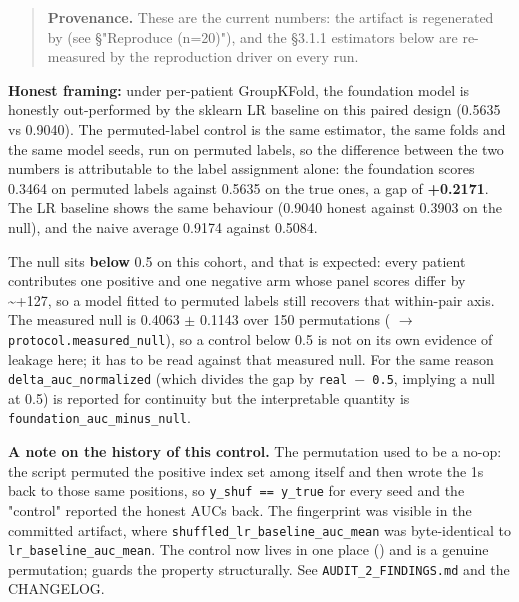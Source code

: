 \documentclass[11pt]{article}
\begin{document}
\begin{quote}
\textbf{Provenance.} These are the current numbers: the artifact is regenerated by  (see  \S{}"Reproduce (n=\allowbreak{}20)"), and the \S{}3.1.1 estimators below are re-measured by the reproduction driver on every run.

\end{quote}

\textbf{Honest framing:} under per-patient GroupKFold, the foundation model is honestly out-performed by the sklearn LR baseline on this paired design (0.5635 vs 0.9040). The permuted-label control is the same estimator, the same folds and the same model seeds, run on permuted labels, so the difference between the two numbers is attributable to the label assignment alone: the foundation scores 0.3464 on permuted labels against 0.5635 on the true ones, a gap of \textbf{+0.2171}. The LR baseline shows the same behaviour (0.9040 honest against 0.3903 on the null), and the naive average 0.9174 against 0.5084.

The null sits \textbf{below} 0.5 on this cohort, and that is expected: every patient contributes one positive and one negative arm whose panel scores differ by \textasciitilde{}+127, so a model fitted to permuted labels still recovers that within-pair axis. The measured null is 0.4063 $\pm$ 0.1143 over 150 permutations ( $\rightarrow$ \texttt{protocol.measured\_\allowbreak{}null}), so a control below 0.5 is not on its own evidence of leakage here; it has to be read against that measured null. For the same reason \texttt{delta\_\allowbreak{}auc\_\allowbreak{}normalized} (which divides the gap by \texttt{real $-$ 0.5}, implying a null at 0.5) is reported for continuity but the interpretable quantity is \texttt{foundation\_\allowbreak{}auc\_\allowbreak{}minus\_\allowbreak{}null}.

\textbf{A note on the history of this control.} The permutation used to be a no-op: the script permuted the positive index set among itself and then wrote the 1s back to those same positions, so \texttt{y\_\allowbreak{}shuf == y\_\allowbreak{}true} for every seed and the "control" reported the honest AUCs back. The fingerprint was visible in the committed artifact, where \texttt{shuffled\_\allowbreak{}lr\_\allowbreak{}baseline\_\allowbreak{}auc\_\allowbreak{}mean} was byte-identical to \texttt{lr\_\allowbreak{}baseline\_\allowbreak{}auc\_\allowbreak{}mean}. The control now lives in one place () and is a genuine permutation;  guards the property structurally. See \texttt{AUDIT\_\allowbreak{}2\_\allowbreak{}FINDINGS.md} and the CHANGELOG.
\end{document}

